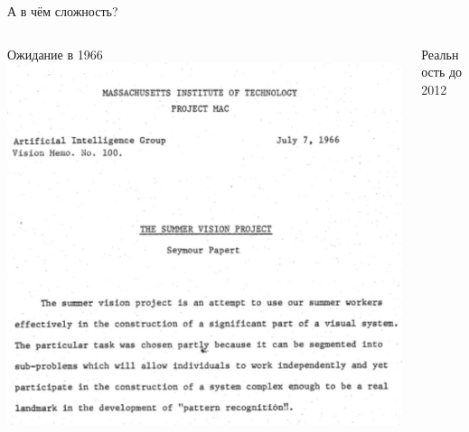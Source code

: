 \documentclass[aspectratio=169, professionalfonts]{beamer}
\begin{document}
\begin{frame}{А в чём сложность?}
    \begin{columns}
        \begin{column}{.43\linewidth}
            \centering
            Ожидание в 1966
            \includegraphics[width=\linewidth]{graphs/fig6_1.jpg}
        \end{column}
        \pause
        \begin{column}{.24\linewidth}
            \centering
            Реальность до 2012

\end{column}
\end{columns}
\end{frame}
\end{document}
